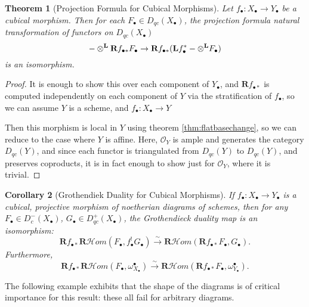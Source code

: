 \documentclass[proquest]{uwthesis}[2014/11/13]
\newtheorem{theorem}{Theorem}[section]
\newtheorem{cor}[theorem]{Corollary}
\theoremstyle{definition}
\newcommand{\cHom}{\mathcal{H} \textit{om}}
\newcommand{\bL}{\textbf{L}}
\newcommand{\OO}{\mathcal{O}}
\newcommand{\bR}{\textbf{R}}
\newcommand{\otimesL}{\otimes^{\bf L}}
\begin{document}
\begin{theorem}[Projection Formula for Cubical Morphisms]
	\label{thm:projectionformula}
	Let $f_\bullet : X_\bullet \rightarrow Y_\bullet$ be a cubical morphism.
	Then for each $F_\bullet \in D_{qc}(X_\bullet)$, the projection formula natural transformation of functors on $D_{qc}(X_\bullet)$
	\[
	- \otimesL \bR f_{\bullet *} F_\bullet \rightarrow \bR f_{\bullet *}(\bL f_\bullet^* - \otimesL F_\bullet)
	\]
	is an isomorphism.
\end{theorem}
\begin{proof}	
	It is enough to show this over each component of $Y_\bullet$, and $\bR f_{\bullet *}$ is computed independently on each component of $Y$ via the stratification of $f_\bullet$, so we can assume $Y$ is a scheme, and $f_\bullet : X_\bullet \rightarrow Y$
	
	Then this morphism is local in $Y$ using theorem \ref{thm:flatbasechange}, so we can reduce to the case where $Y$ is affine.
	Here, $\OO_Y$ is ample and generates the category $D_{qc}(Y)$, and since each functor is triangulated from $D_{qc}(Y)$ to $D_{qc}(Y)$, and preserves coproducts, it is in fact enough to show just for $\OO_Y$, where it is trivial.
\end{proof}

\begin{cor}[Grothendiek Duality for Cubical Morphisms]
	\label{cor:cubicalgrothdual}
	If $f_\bullet : X_\bullet \rightarrow Y_\bullet$ is a cubical, projective morphism of noetherian diagrams of schemes, then for any $F_\bullet \in D_{c}^-(X_\bullet)$, $G_\bullet \in D_{qc}^+(X_\bullet)$, the Grothendieck duality map is an isomorphism:
	\[
		\bR f_{\bullet *} \bR \cHom(F_\bullet, f_\bullet^! G_\bullet) \xrightarrow{\sim} \bR \cHom(\bR f_{\bullet *} F_\bullet, G_\bullet).
	\]
	Furthermore,
	\[
		\bR f_{\bullet *} \bR \cHom(F_\bullet, \omega_{X_\bullet}^\bullet) \xrightarrow{\sim} \bR \cHom(\bR f_{\bullet *} F_\bullet, \omega_{Y_\bullet}^\bullet).
	\]
\end{cor}

The following example exhibits that the shape of the diagrams is of critical importance for this result: these all fail for arbitrary diagrams.
\end{document}

